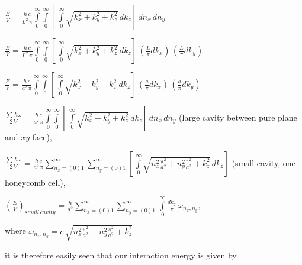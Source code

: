 \documentclass[twoside, 10pt]{article}
\begin{document}
\begin{multicols}{2}
    \(\frac{E}{V} = \frac{\hbar\,c}{L^2\,\pi}\int\limits_{0}^{\infty}\int\limits_{0}^{\infty}\left[\,\int\limits_{0}^{\infty}\sqrt{k_x^2+k_y^2+k_z^2}\,dk_z\right]\,dn_x\,dn_y\)

\noindent
    \(\frac{E}{V} = \frac{\hbar\,c}{L^2\,\pi}\int\limits_{0}^{\infty}\int\limits_{0}^{\infty}\left[\,\int\limits_{0}^{\infty}\sqrt{k_x^2+k_y^2+k_z^2}\,dk_z\right]\,\left(\frac{L}{\pi}dk_x\right)\,\left(\frac{L}{\pi}dk_y\right)\)

\noindent
    \(\frac{E}{V} = \frac{\hbar\,c}{a^2\,\pi}\int\limits_{0}^{\infty}\int\limits_{0}^{\infty}\left[\,\int\limits_{0}^{\infty}\sqrt{k_x^2+k_y^2+k_z^2}\,dk_z\right]\,\left(\frac{a}{\pi}dk_x\right)\,\left(\frac{a}{\pi}dk_y\right)\)

    \(\frac{\sum\,\hbar\omega}{2\,V} = \frac{\hbar\,c}{a^2\,\pi}\int\limits_{0}^{\infty}\int\limits_{0}^{\infty}\left[\,\int\limits_{0}^{\infty}\sqrt{k_x^2+k_y^2+k_z^2}\,dk_z\right]\,dn_x\,dn_y\)
(large cavity between pure plane and \(xy\) face),

\noindent
    \(\frac{\sum\,\hbar\omega}{2\,V} = \frac{\hbar\,c}{a^2\,\pi}\sum\limits_{n_x=(0)1}^{\infty}\sum\limits_{n_y=(0)1}^{\infty}\left[\,\int\limits_{0}^{\infty}\sqrt{n_x^2\frac{\pi^2}{a^2}+n_y^2\frac{\pi^2}{a^2}+k_z^2}\,dk_z\right]\)
(small cavity, one honeycomb cell),

    \({\left(\frac{E}{V}\right)_{small\,cavity} = \frac{\hbar}{a^2} \sum\limits_{n_x=(0)1}^{\infty}\sum\limits_{n_y=(0)1}^{\infty}\,\int\limits_{0}^{\infty} {\frac {dk_{z}}{\pi}}\,\omega _{n_x,n_y},}\)

    where
\(\omega _{n_x,n_y} = c\,\sqrt{n_x^2\frac{\pi^2}{a^2}+n_y^2\frac{\pi^2}{a^2}+k_z^2}\)

    it is therefore easily seen that our interaction energy is given by


\end{multicols}
\end{document}
